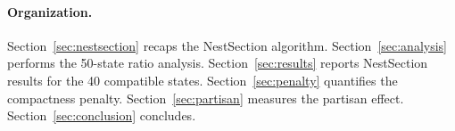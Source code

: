 \paragraph{Organization.}
Section~\ref{sec:nestsection} recaps the NestSection algorithm.
Section~\ref{sec:analysis} performs the 50-state ratio analysis.
Section~\ref{sec:results} reports NestSection results for the 40 compatible states.
Section~\ref{sec:penalty} quantifies the compactness penalty.
Section~\ref{sec:partisan} measures the partisan effect.
Section~\ref{sec:conclusion} concludes.
